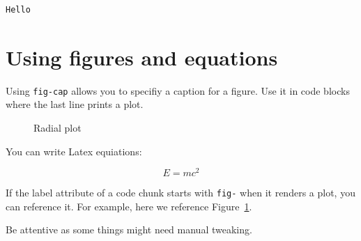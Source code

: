 \documentclass[
  number,
  preprint,
  3p,
  twocolumn]{elsarticle}
\begin{document}
\begin{verbatim}
Hello
\end{verbatim}

\section{Using figures and equations}\label{using-figures-and-equations}

Using \texttt{fig-cap} allows you to specifiy a caption for a figure.
Use it in code blocks where the last line prints a plot.

\begin{figure}


\caption{\label{fig-radial}Radial plot}

\end{figure}%

You can write Latex equiations:

\[
E=mc^2
\]

If the label attribute of a code chunk starts with \texttt{fig-} when it
renders a plot, you can reference it. For example, here we reference
Figure~\ref{fig-radial}.

Be attentive as some things might need manual tweaking.
\end{document}
